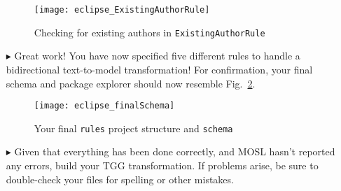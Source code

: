 \begin{itemize}
\vspace{0.5cm}

\begin{figure}[htbp]
\begin{center}
  \texttt{[image: eclipse\_ExistingAuthorRule]}
  \caption{Checking for existing authors in \texttt{ExistingAuthorRule}}
  \label{eclipse:ForExistingAuthorRule}
\end{center}
\end{figure}

\newpage

\item[$\blacktriangleright$] Great work! You have now specified five different rules to handle a bidirectional text-to-model transformation! For confirmation,
your final schema and package explorer should now resemble Fig.~\ref{eclipse:schemaFinal}.

\vspace{0.5cm}

\begin{figure}[htbp]
\begin{center}
  \texttt{[image: eclipse\_finalSchema]}
  \caption{Your final \texttt{rules} project structure and \texttt{schema}}
  \label{eclipse:schemaFinal}
\end{center}
\end{figure}

\vspace{0.5cm}

\item[$\blacktriangleright$] Given that everything has been done correctly, and MOSL hasn't reported any errors, build your TGG transformation. If problems
arise, be sure to double-check your files for spelling or other mistakes.

\end{itemize}
